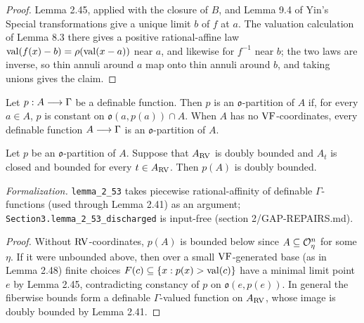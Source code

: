 \begin{proof}
\leanok
Lemma 2.45, applied with the closure of $B$, and Lemma 9.4 of Yin's Special transformations give a unique limit $b$ of $f$ at $a$. The valuation calculation of Lemma 8.3 there gives a positive rational-affine law $\operatorname{val}(f(x) - b) = \rho(\operatorname{val}(x - a))$ near $a$, and likewise for $f^{-1}$ near $b$; the two laws are inverse, so thin annuli around $a$ map onto thin annuli around $b$, and taking unions gives the claim.
\end{proof}

\setcounter{theorem}{51}
\begin{definition}
\label{s2-o-partition}
\leanok
{}
Let $p : A \longrightarrow \Gamma$ be a definable function. Then $p$ is an $\mathfrak{o}$-partition of $A$ if, for every $a \in A$, $p$ is constant on $\mathfrak{o}(a, p(a)) \cap A$. When $A$ has no $\mathrm{VF}$-coordinates, every definable function $A \longrightarrow \Gamma$ is an $\mathfrak{o}$-partition of $A$.
\end{definition}

\setcounter{theorem}{52}
\begin{lemma}
\label{vol-par-bounded}
\leanok
{}
Let $p$ be an $\mathfrak{o}$-partition of $A$. Suppose that $A_{\mathrm{RV}}$ is doubly bounded and $A_t$ is closed and bounded for every $t \in A_{\mathrm{RV}}$. Then $p(A)$ is doubly bounded.

\emph{Formalization.} \texttt{lemma\_2\_53} takes piecewise rational-affinity of definable $\Gamma$-functions (used through Lemma 2.41) as an argument; \texttt{Section3.lemma\_2\_53\_discharged} is input-free (section 2/GAP-REPAIRS.md).
\end{lemma}

\begin{proof}
\leanok
Without $\mathrm{RV}$-coordinates, $p(A)$ is bounded below since $A \subseteq \mathcal{O}_\eta^n$ for some $\eta$. If it were unbounded above, then over a small $\mathrm{VF}$-generated base (as in Lemma 2.48) finite choices $F(c) \subseteq \{x : p(x) > \operatorname{val}(c)\}$ have a minimal limit point $e$ by Lemma 2.45, contradicting constancy of $p$ on $\mathfrak{o}(e, p(e))$. In general the fiberwise bounds form a definable $\Gamma$-valued function on $A_{\mathrm{RV}}$, whose image is doubly bounded by Lemma 2.41.
\end{proof}

